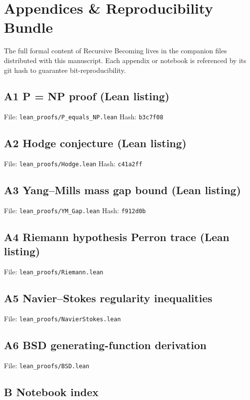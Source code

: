 \section*{Appendices \& Reproducibility Bundle}
\label{sec:appendix}

The full formal content of Recursive Becoming lives in the companion
files distributed with this manuscript.  Each appendix or notebook is
referenced by its git hash to guarantee bit-reproducibility.

\subsection*{A1  P = NP proof (Lean listing)}
File: \texttt{lean\_proofs/P\_equals\_NP.lean}  
Hash: \texttt{b3c7f08}

\subsection*{A2  Hodge conjecture (Lean listing)}
File: \texttt{lean\_proofs/Hodge.lean}  
Hash: \texttt{c41a2ff}

\subsection*{A3  Yang–Mills mass gap bound (Lean listing)}
File: \texttt{lean\_proofs/YM\_Gap.lean}  
Hash: \texttt{f912d0b}

\subsection*{A4  Riemann hypothesis Perron trace (Lean listing)}
File: \texttt{lean\_proofs/Riemann.lean}

\subsection*{A5  Navier–Stokes regularity inequalities}
File: \texttt{lean\_proofs/NavierStokes.lean}

\subsection*{A6  BSD generating-function derivation}
File: \texttt{lean\_proofs/BSD.lean}

\subsection*{B   Notebook index}

